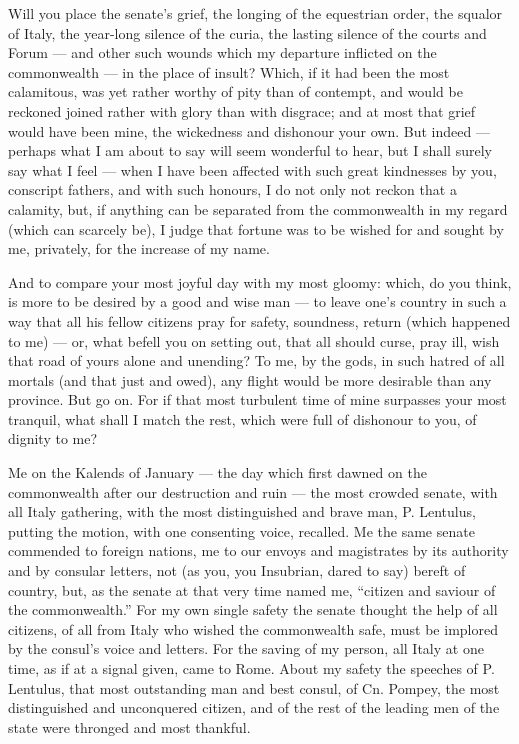  Will you place the senate's grief, the longing of the equestrian order, the squalor of Italy, the year-long silence of the curia, the lasting silence of the courts and Forum — and other such wounds which my departure inflicted on the commonwealth — in the place of insult? Which, if it had been the most calamitous, was yet rather worthy of pity than of contempt, and would be reckoned joined rather with glory than with disgrace; and at most that grief would have been mine, the wickedness and dishonour your own. But indeed — perhaps what I am about to say will seem wonderful to hear, but I shall surely say what I feel — when I have been affected with such great kindnesses by you, conscript fathers, and with such honours, I do not only not reckon that a calamity, but, if anything can be separated from the commonwealth in my regard (which can scarcely be), I judge that fortune was to be wished for and sought by me, privately, for the increase of my name.

 And to compare your most joyful day with my most gloomy: which, do you think, is more to be desired by a good and wise man — to leave one's country in such a way that all his fellow citizens pray for safety, soundness, return (which happened to me) — or, what befell you on setting out, that all should curse, pray ill, wish that road of yours alone and unending? To me, by the gods, in such hatred of all mortals (and that just and owed), any flight would be more desirable than any province. But go on. For if that most turbulent time of mine surpasses your most tranquil, what shall I match the rest, which were full of dishonour to you, of dignity to me?

 Me on the Kalends of January — the day which first dawned on the commonwealth after our destruction and ruin — the most crowded senate, with all Italy gathering, with the most distinguished and brave man, P. Lentulus, putting the motion, with one consenting voice, recalled. Me the same senate commended to foreign nations, me to our envoys and magistrates by its authority and by consular letters, not (as you, you Insubrian, dared to say) bereft of country, but, as the senate at that very time named me, ``citizen and saviour of the commonwealth.'' For my own single safety the senate thought the help of all citizens, of all from Italy who wished the commonwealth safe, must be implored by the consul's voice and letters. For the saving of my person, all Italy at one time, as if at a signal given, came to Rome. About my safety the speeches of P. Lentulus, that most outstanding man and best consul, of Cn. Pompey, the most distinguished and unconquered citizen, and of the rest of the leading men of the state were thronged and most thankful.


